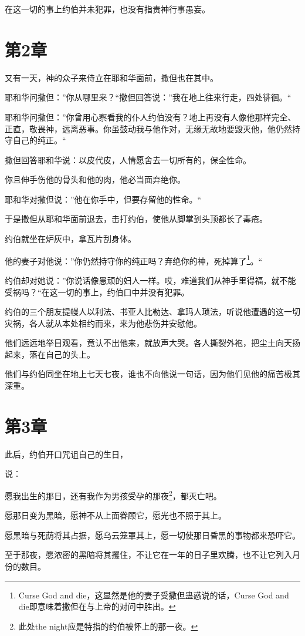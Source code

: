 \documentclass[12pt,oneside]{book}
\begin{document}
在这一切的事上约伯并未犯罪，也没有指责神行事愚妄。

\chapter{第2章}
又有一天，神的众子来侍立在耶和华面前，撒但也在其中。

耶和华问撒但：”你从哪里来？“撒但回答说：”我在地上往来行走，四处徘徊。“

耶和华问撒但：”你曾用心察看我的仆人约伯没有？地上再没有人像他那样完全、正直，敬畏神，远离恶事。你虽鼓动我与他作对，无缘无故地要毁灭他，他仍然持守自己的纯正。“

撒但回答耶和华说：以皮代皮，人情愿舍去一切所有的，保全性命。

你且伸手伤他的骨头和他的肉，他必当面弃绝你。

耶和华对撒但说：”他在你手中，但要存留他的性命。“

于是撒但从耶和华面前退去，击打约伯，使他从脚掌到头顶都长了毒疮。

约伯就坐在炉灰中，拿瓦片刮身体。

他的妻子对他说：”你仍然持守你的纯正吗？弃绝你的神，死掉算了\footnote{Curse God and die，这显然是他的妻子受撒但蛊惑说的话，Curse God and die即意味着撒但在与上帝的对问中胜出。}。“

约伯却对她说：”你说话像愚顽的妇人一样。哎，难道我们从神手里得福，就不能受祸吗？“在这一切的事上，约伯口中并没有犯罪。

约伯的三个朋友提幔人以利法、书亚人比勒达、拿玛人琐法，听说他遭遇的这一切灾祸，各人就从本处相约而来，来为他悲伤并安慰他。

他们远远地举目观看，竟认不出他来，就放声大哭。各人撕裂外袍，把尘土向天扬起来，落在自己的头上。

他们与约伯同坐在地上七天七夜，谁也不向他说一句话，因为他们见他的痛苦极其深重。


\chapter{第3章}
此后，约伯开口咒诅自己的生日，

说：

愿我出生的那日，还有我作为男孩受孕的那夜\footnote{此处the night应是特指的约伯被怀上的那一夜。}，都灭亡吧。

愿那日变为黑暗，愿神不从上面眷顾它，愿光也不照于其上。

愿黑暗与死荫将其占据，愿乌云笼罩其上，愿一切使那日昏黑的事物都来恐吓它。

至于那夜，愿浓密的黑暗将其攫住，不让它在一年的日子里欢腾，也不让它列入月份的数目。
\end{document}
